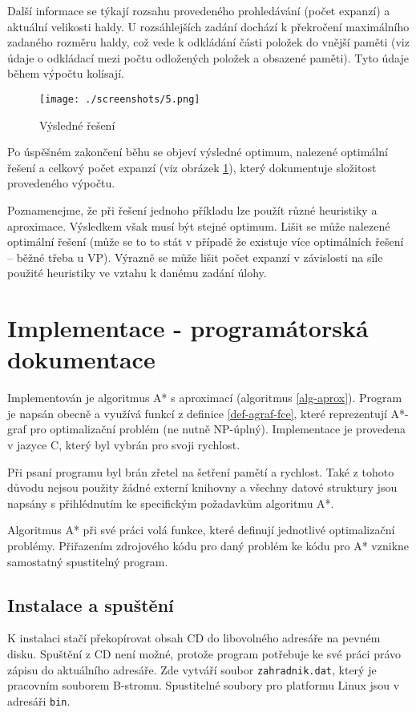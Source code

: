 \documentclass[12pt,notitlepage,fleqn]{report} %
\theoremstyle{definition}
\newcommand{\code}[1]{\texttt{#1}}
\begin{document}
Další informace se týkají rozsahu provedeného prohledávání (počet expanzí) a aktuální velikosti haldy. U rozsáhlejších zadání dochází k překročení maximálního zadaného rozměru haldy, což vede k odkládání části položek do vnější paměti (viz údaje o odkládací mezi počtu odložených položek a obsazené paměti). Tyto údaje během výpočtu kolísají.

\begin{figure}[h]
 \centering
 \texttt{[image: ./screenshots/5.png]}
 \caption{Výsledné řešení}
 \label{fig:gui-5}
\end{figure}
Po úspěšném zakončení běhu se objeví výsledné optimum, nalezené optimální řešení a celkový počet expanzí (viz obrázek \ref{fig:gui-5}), který dokumentuje složitost provedeného výpočtu. 

Poznamenejme, že při řešení jednoho příkladu lze použít různé heuristiky a aproximace. Výsledkem však musí být stejné optimum. Lišit se může nalezené optimální řešení (může se to to stát v případě že existuje více optimálních řešení -- běžné třeba u VP). Výrazně se může lišit počet expanzí v závislosti na síle použité heuristiky ve vztahu k danému zadání úlohy.

\chapter{Implementace - programátorská dokumentace}
Implementován je algoritmus A* s aproximací (algoritmus \ref{alg-aprox}). Program je napsán obecně a využívá funkcí z definice \ref{def-agraf-fce}, které reprezentují A*-graf pro optimalizační problém (ne nutně NP-úplný). Implementace je provedena v jazyce C, který byl vybrán pro svoji rychlost.

Při psaní programu byl brán zřetel na šetření pamětí a rychlost. Také z tohoto důvodu nejsou použity žádné externí knihovny a všechny datové struktury jsou napsány s přihlédnutím ke specifickým požadavkům algoritmu A*.

Algoritmus A* při své práci volá funkce, které definují jednotlivé optimalizační problémy. Přiřazením zdrojového kódu pro daný problém ke kódu pro A* vznikne samostatný spustitelný program.

  \section{Instalace a spuštění}
  \label{sect-prog-inst}
  K instalaci stačí překopírovat obsah CD do libovolného adresáře na pevném disku. Spuštění z CD není možné, protože program potřebuje ke své práci právo zápisu do aktuálního adresáře. Zde vytváří soubor \code{zahradnik.dat}, který je pracovním souborem B-stromu. Spustitelné soubory pro platformu Linux jsou v adresáři \code{bin}. 
  
\end{document}
